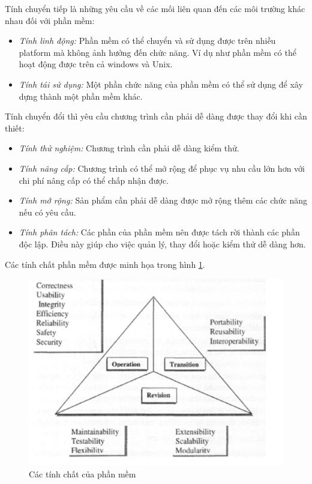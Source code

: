\documentclass{article}
\begin{document}
	Tính chuyển tiếp là những yêu cầu về các mối liên quan đến các môi trường khác nhau đối với phần mềm:
	\begin{itemize}
		\item \textit{Tính linh động:} Phần mềm có thể chuyển và sử dụng được trên nhiều platform mà không ảnh hưởng đến chức năng. Ví dụ như phần mềm có thể hoạt động được trên cả windows và Unix.
		\item \textit{Tính tái sử dụng:} Một phần chức năng của phần mềm có thể sử dụng để xây dựng thành một phần mềm khác.
		\end{itemize}
		
	Tính chuyển đổi thì yêu cầu chương trình cần phải dễ dàng được thay đổi khi cần thiết:
	\begin{itemize}
		\item \textit{Tính thử nghiệm:} Chương trình cần phải dễ dàng kiểm thử.
		\item \textit{Tính nâng cấp:} Chương trình có thể mở rộng để phục vụ nhu cầu lớn hơn với chi phí nâng cấp có thể chấp nhận được.
		\item \textit{Tính mở rộng:} Sản phẩm cần phải dễ dàng được mở rộng thêm các chức năng nếu có yêu cầu.
		\item \textit{Tính phân tách:} Các phần của phần mềm nên được tách rời thành các phần độc lập. Điều này giúp cho việc quản lý, thay đổi hoặc kiểm thử dễ dàng hơn.
		\end{itemize}

	Các tính chất phần mềm được minh họa trong hình \ref{fig:characteristics}.
	
	\begin{figure}[h][h]
		\centering
		\includegraphics[scale=0.3]{figures/characteristics.png}
		\caption{Các tính chất của phần mềm}
		\label{fig:characteristics}
	\end{figure}
	
\end{document}
